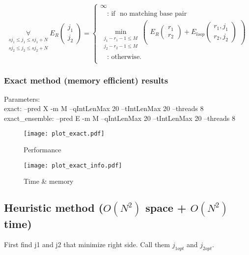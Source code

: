 \begin{equation*}
\underset{\substack{sj_{1} \le j_{1} \le sj_{1}+N\\sj_{2} \le j_{2} \le sj_{2}+N}}{\forall}
E_R(\substack{j_1\\j_2}) = \begin{cases}
\infty\\
\quad\text{: if } \text{ no matching base pair }\\
\min\limits_{\substack{j_{1}-r_{1}-1 \le M\\j_{2}-r_{2}-1 \le M}}
\begin{pmatrix}
E_R(\substack{r_1\\r_2}) + E_{loop}(\substack{r_1,j_1\\r_2,j_2})
\end{pmatrix}\\
\quad\text{: otherwise.}\\

\end{cases}
\end{equation*}

\clearpage

\subsubsection{Exact method (memory efficient) results}

Parameters:\\
exact: --pred X -m M --qIntLenMax 20 --tIntLenMax 20 --threads 8\\
exact\_ensemble: --pred E -m M --qIntLenMax 20 --tIntLenMax 20 --threads 8\\

\begin{figure}[H]
	\centering
	\caption{Performance}
	\texttt{[image: plot\_exact.pdf]}
\end{figure}

\begin{figure}[H]
	\centering
	\caption{Time \& memory}
	\texttt{[image: plot\_exact\_info.pdf]}
\end{figure}

\clearpage

\subsection{Heuristic method ($O(N^{2})$ space + $O(N^{2})$ time)}

First find j1 and j2 that minimize right side. Call them $j_{1opt}$ and $j_{2opt}$. 

